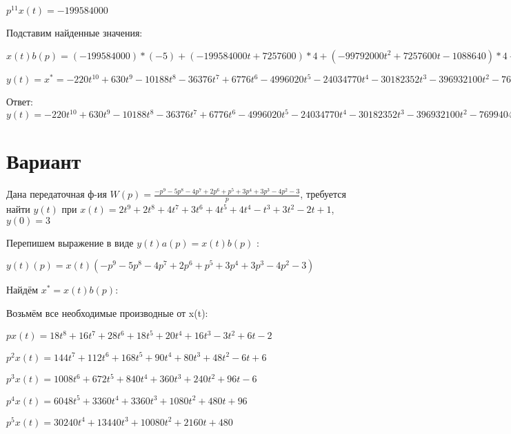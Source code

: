 \documentclass{article}
\begin{document}
{{{{$p^11x(t)=-199584000$

Подставим найденные значения:

$x(t)b(p) = (-199584000)*(-5)+(-199584000t+7257600)*4+(-99792000t^{2}+7257600t-1088640)*4+(-33264000t^{3}+3628800t^{2}-1088640t+161280)*1+(-8316000t^{4}+1209600t^{3}-544320t^{2}+161280t-10080)*3+(-1663200t^{5}+302400t^{4}-181440t^{3}+80640t^{2}-10080t-3600)*3+(-39600t^{7}+10080t^{6}-9072t^{5}+6720t^{4}-1680t^{3}-1800t^{2}+72)*1+(-4950t^{8}+1440t^{7}-1512t^{6}+1344t^{5}-420t^{4}-600t^{3}+72t-12)*2+(-550t^{9}+180t^{8}-216t^{7}+224t^{6}-84t^{5}-150t^{4}+36t^{2}-12t-2)*(-1)+(-55t^{10}+20t^{9}-27t^{8}+32t^{7}-14t^{6}-30t^{5}+12t^{3}-6t^{2}-2t+4)*4=-220t^{10}+630t^{9}-10188t^{8}-36376t^{7}+6776t^{6}-4996020t^{5}-24034770t^{4}-30182352t^{3}-396932100t^{2}-769940492t$





$y(t)=x^*=-220t^{10}+630t^{9}-10188t^{8}-36376t^{7}+6776t^{6}-4996020t^{5}-24034770t^{4}-30182352t^{3}-396932100t^{2}-769940492t$

Ответ: $y(t) = -220t^{10}+630t^{9}-10188t^{8}-36376t^{7}+6776t^{6}-4996020t^{5}-24034770t^{4}-30182352t^{3}-396932100t^{2}-769940492t$

\section{Вариант}

Дана передаточная ф-ия $W(p)=\frac{-p^{9}-5p^{8}-4p^{7}+2p^{6}+p^{5}+3p^{4}+3p^{3}-4p^{2}-3}{p}$, требуется найти $y(t)$ при $x(t)=2t^{9}+2t^{8}+4t^{7}+3t^{6}+4t^{5}+4t^{4}-t^{3}+3t^{2}-2t+1$, $y(0)=3$

Перепишем выражение в виде $y(t)a(p)=x(t)b(p)$ :

$y(t)(p)=x(t)(-p^{9}-5p^{8}-4p^{7}+2p^{6}+p^{5}+3p^{4}+3p^{3}-4p^{2}-3)$

Найдём $x^*=x(t)b(p)$:

Возьмём все необходимые производные от x(t):

$px(t)=18t^{8}+16t^{7}+28t^{6}+18t^{5}+20t^{4}+16t^{3}-3t^{2}+6t-2$

$p^2x(t)=144t^{7}+112t^{6}+168t^{5}+90t^{4}+80t^{3}+48t^{2}-6t+6$

$p^3x(t)=1008t^{6}+672t^{5}+840t^{4}+360t^{3}+240t^{2}+96t-6$

$p^4x(t)=6048t^{5}+3360t^{4}+3360t^{3}+1080t^{2}+480t+96$

$p^5x(t)=30240t^{4}+13440t^{3}+10080t^{2}+2160t+480$

}}}}
\end{document}
